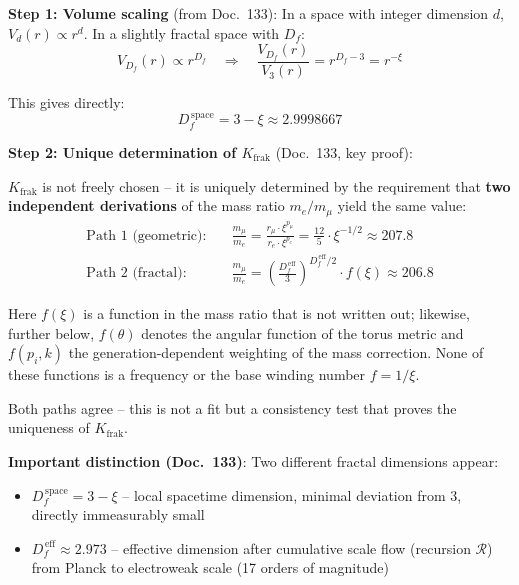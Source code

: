 \textbf{Step 1: Volume scaling} (from Doc.~133):
In a space with integer dimension $d$, $V_d(r) \propto r^d$.
In a slightly fractal space with $D_f$:
\begin{equation}
    V_{D_f}(r) \propto r^{D_f}
    \quad \Rightarrow \quad
    \frac{V_{D_f}(r)}{V_3(r)} = r^{D_f - 3} = r^{-\xi}
\end{equation}

This gives directly:
\begin{equation}
    \boxed{D_f^{\,\text{space}} = 3 - \xi \approx 2.9998667}
\end{equation}

\textbf{Step 2: Unique determination of $K_{\text{frak}}$}
(Doc.~133, key proof):

$K_{\text{frak}}$ is not freely chosen -- it is uniquely determined
by the requirement that \textbf{two independent derivations} of the
mass ratio $m_e/m_\mu$ yield the same value:
\begin{align}
    \text{Path 1 (geometric):} &\quad
    \frac{m_\mu}{m_e} = \frac{r_\mu \cdot \xi^{p_\mu}}{r_e \cdot \xi^{p_e}}
    = \frac{12}{5} \cdot \xi^{-1/2} \approx 207.8 \\
    \text{Path 2 (fractal):} &\quad
    \frac{m_\mu}{m_e} = \left(\frac{D_f^{\,\text{eff}}}{3}\right)^{\!D_f^{\,\text{eff}}/2}
    \cdot f(\xi) \approx 206.8
\end{align}

Here $f(\xi)$ is a function in the mass ratio that is not written out;
likewise, further below, $f(\theta)$ denotes the angular function of the
torus metric and $f(p_i,k)$ the generation-dependent weighting of the mass
correction. None of these functions is a frequency or the base winding
number $f = 1/\xi$.

Both paths agree -- this is not a fit but a consistency test that
proves the uniqueness of $K_{\text{frak}}$.

\textbf{Important distinction (Doc.~133)}: Two different fractal
dimensions appear:
\begin{itemize}
    \item $D_f^{\,\text{space}} = 3 - \xi$ -- local spacetime dimension,
          minimal deviation from 3, directly immeasurably small
    \item $D_f^{\,\text{eff}} \approx 2.973$ -- effective dimension after
          cumulative scale flow (recursion $\mathcal{R}$) from Planck to
          electroweak scale (17 orders of magnitude)
\end{itemize}

